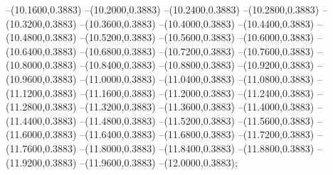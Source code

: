 {	--(10.1600,0.3883)
	--(10.2000,0.3883)
	--(10.2400,0.3883)
	--(10.2800,0.3883)
	--(10.3200,0.3883)
	--(10.3600,0.3883)
	--(10.4000,0.3883)
	--(10.4400,0.3883)
	--(10.4800,0.3883)
	--(10.5200,0.3883)
	--(10.5600,0.3883)
	--(10.6000,0.3883)
	--(10.6400,0.3883)
	--(10.6800,0.3883)
	--(10.7200,0.3883)
	--(10.7600,0.3883)
	--(10.8000,0.3883)
	--(10.8400,0.3883)
	--(10.8800,0.3883)
	--(10.9200,0.3883)
	--(10.9600,0.3883)
	--(11.0000,0.3883)
	--(11.0400,0.3883)
	--(11.0800,0.3883)
	--(11.1200,0.3883)
	--(11.1600,0.3883)
	--(11.2000,0.3883)
	--(11.2400,0.3883)
	--(11.2800,0.3883)
	--(11.3200,0.3883)
	--(11.3600,0.3883)
	--(11.4000,0.3883)
	--(11.4400,0.3883)
	--(11.4800,0.3883)
	--(11.5200,0.3883)
	--(11.5600,0.3883)
	--(11.6000,0.3883)
	--(11.6400,0.3883)
	--(11.6800,0.3883)
	--(11.7200,0.3883)
	--(11.7600,0.3883)
	--(11.8000,0.3883)
	--(11.8400,0.3883)
	--(11.8800,0.3883)
	--(11.9200,0.3883)
	--(11.9600,0.3883)
	--(12.0000,0.3883);
}

